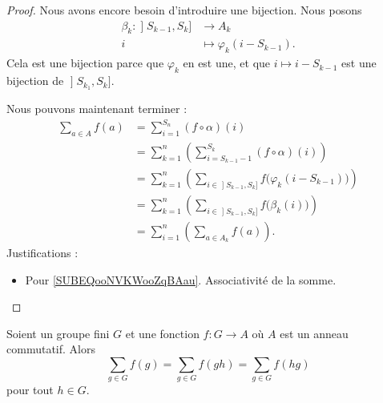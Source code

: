 \begin{proof}
    Nous avons encore besoin d'introduire une bijection. Nous posons
    \begin{equation}
        \begin{aligned}
        \beta_k\colon \mathopen] S_{k-1} , S_k \mathclose]&\to A_k \\
        i&\mapsto \varphi_k(i-S_{k-1}). 
        \end{aligned}
    \end{equation}
    Cela est une bijection parce que \( \varphi_k\) en est une, et que \( i\mapsto i-S_{k-1}\) est une bijection de \( \mathopen] S_{k_1} , S_k \mathclose]\).

    Nous pouvons maintenant terminer :
    \begin{subequations}
        \begin{align}
            \sum_{a\in A}f(a)&=\sum_{i=1}^{S_n}(f\circ \alpha)(i)\\
            &=\sum_{k=1}^n\left( \sum_{i=S_{k-1}-1}^{S_k}(f\circ \alpha)(i) \right)        \label{SUBEQooNVKWooZqBAau}\\
        &=\sum_{k=1}^n\left( \sum_{i\in \mathopen] S_{k-1} , S_k \mathclose]}f\big( \varphi_k(i-S_{k-1}) \big)  \right)\\
    &=\sum_{k=1}^n\left( \sum_{i\in \mathopen] S_{k-1} , S_k \mathclose]}f\big( \beta_k(i) \big) \right)\\
    &=\sum_{i=1}^n\left( \sum_{a\in A_k}f(a) \right).
        \end{align}
    \end{subequations}
    Justifications :
    \begin{itemize}
        \item Pour \eqref{SUBEQooNVKWooZqBAau}. Associativité de la somme.
    \end{itemize}
\end{proof}


\begin{proposition}     \label{PROPooWJQQooFINSEc}
    Soient un groupe fini \( G\) et une fonction \( f\colon G\to A\) où \( A\) est un anneau commutatif. Alors
    \begin{equation}
        \sum_{g\in G}f(g)=\sum_{g\in G}f(gh)=\sum_{g\in G}f(hg)
    \end{equation}
    pour tout \( h\in G\).
\end{proposition}

